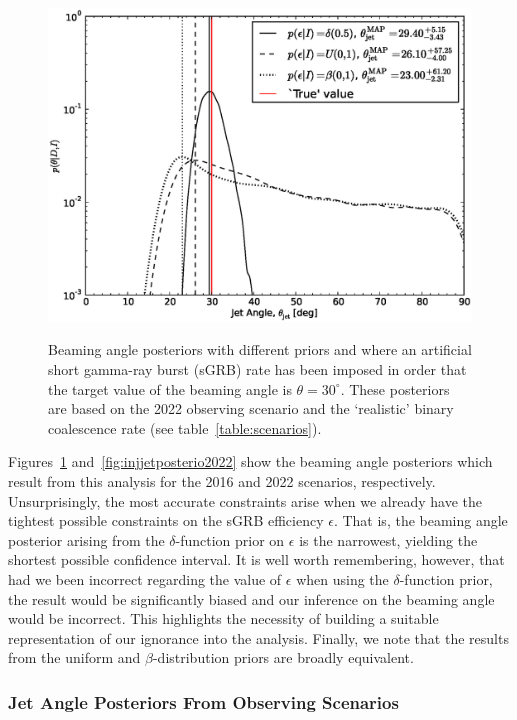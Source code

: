 \documentclass[twocolumn,nofootinbib]{revtex4-1}
\def\sgrb#1{short gamma-ray burst#1 (sGRB#1)\gdef\sgrb{sGRB}}
\begin{document}
\begin{figure}
\centering
{\includegraphics[width=\linewidth]{jet_angle_posterior_aligo_2022.eps}}
\caption{Beaming angle posteriors with different priors and where an artificial \sgrb{}
    rate has been imposed in order that the target value of the beaming angle is
$\theta = 30^{\circ}$.  These posteriors are based on the 2022 observing
scenario and the `realistic' binary coalescence rate (see
table~\ref{table:scenarios}). \label{fig:injjetposterio2016}}
\end{figure}
%
Figures~\ref{fig:injjetposterio2016} and~\ref{fig:injjetposterio2022} show the
beaming angle posteriors which result from this analysis for the 2016 and 2022
scenarios, respectively.  Unsurprisingly, the most accurate constraints arise
when we already have the tightest possible constraints on the \sgrb{} efficiency
$\epsilon$.  That is, the beaming angle posterior arising from the
$\delta$-function prior on $\epsilon$ is the narrowest, yielding the shortest
possible confidence interval.  It is well worth remembering, however, that had
we been incorrect regarding the value of $\epsilon$ when using the
$\delta$-function prior, the result would be significantly biased and our
inference on the beaming angle would be incorrect.  This highlights the
necessity of building a suitable representation of our ignorance into the
analysis.  Finally, we note that the results from the uniform and
$\beta$-distribution priors are broadly equivalent.


\subsubsection{Jet Angle Posteriors From Observing Scenarios}
\end{document}
